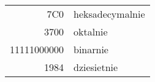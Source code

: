 \documentclass[a4paper,11pt]{article}
\begin{document}
\begin{tabular}{|r|l|} \hline
7C0 & heksadecymalnie \\
3700 & oktalnie \\
11111000000 & binarnie \\
\hline \hline
1984 & dziesietnie \\ \hline
\end{tabular}
\end{document}
